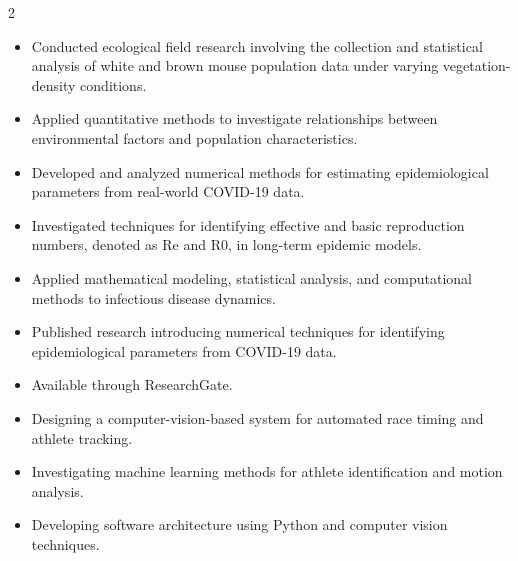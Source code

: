 \documentclass[10pt,a4paper,ragged2e,withhyper]{altacv}
\begin{document}
\begin{paracol}{2}

\begin{itemize}
\item Conducted ecological field research involving the collection and statistical analysis of white and brown mouse population data under varying vegetation-density conditions.
\item Applied quantitative methods to investigate relationships between environmental factors and population characteristics.
\end{itemize}

\divider

\begin{itemize}
\item Developed and analyzed numerical methods for estimating epidemiological parameters from real-world COVID-19 data.
\item Investigated techniques for identifying effective and basic reproduction numbers, denoted as Re and R0, in long-term epidemic models.
\item Applied mathematical modeling, statistical analysis, and computational methods to infectious disease dynamics.
\end{itemize}


\begin{itemize}
\item Published research introducing numerical techniques for identifying epidemiological parameters from COVID-19 data.
\item Available through ResearchGate.
\end{itemize}


\begin{itemize}
\item Designing a computer-vision-based system for automated race timing and athlete tracking.
\item Investigating machine learning methods for athlete identification and motion analysis.
\item Developing software architecture using Python and computer vision techniques.
\end{itemize}


\end{paracol}
\end{document}
